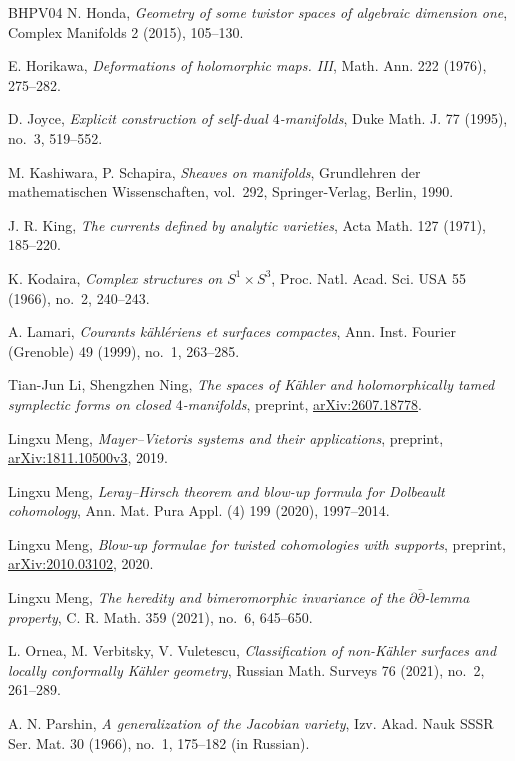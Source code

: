\documentclass[11pt]{amsart}
\numberwithin{equation}{section}
\theoremstyle{plain}
\theoremstyle{definition}
\begin{document}
\begin{thebibliography}{BHPV04}
N. Honda,
\textit{Geometry of some twistor spaces of algebraic dimension one},
Complex Manifolds 2 (2015), 105--130.

E. Horikawa,
\textit{Deformations of holomorphic maps. III},
Math. Ann. 222 (1976), 275--282.

D. Joyce,
\textit{Explicit construction of self-dual $4$-manifolds},
Duke Math. J. 77 (1995), no.~3, 519--552.

M. Kashiwara, P. Schapira,
\textit{Sheaves on manifolds},
Grundlehren der mathematischen Wissenschaften, vol.~292,
Springer-Verlag, Berlin, 1990.

J. R. King,
\textit{The currents defined by analytic varieties},
Acta Math. 127 (1971), 185--220.

K. Kodaira,
\textit{Complex structures on $S^1\times S^3$},
Proc. Natl. Acad. Sci. USA 55 (1966), no.~2, 240--243.

A. Lamari,
\textit{Courants k\"ahl\'eriens et surfaces compactes},
Ann. Inst. Fourier (Grenoble) 49 (1999), no.~1, 263--285.

Tian-Jun Li, Shengzhen Ning,
\textit{The spaces of K\"ahler and holomorphically tamed symplectic forms on
closed $4$-manifolds},
preprint, \href{https://arxiv.org/abs/2607.18778}{arXiv:2607.18778}.

Lingxu Meng,
\textit{Mayer--Vietoris systems and their applications},
preprint, \href{https://arxiv.org/abs/1811.10500v3}{arXiv:1811.10500v3}, 2019.

Lingxu Meng,
\textit{Leray--Hirsch theorem and blow-up formula for Dolbeault cohomology},
Ann. Mat. Pura Appl. (4) 199 (2020), 1997--2014.

Lingxu Meng,
\textit{Blow-up formulae for twisted cohomologies with supports},
preprint, \href{https://arxiv.org/abs/2010.03102}{arXiv:2010.03102}, 2020.

Lingxu Meng,
\textit{The heredity and bimeromorphic invariance of the
$\partial\bar\partial$-lemma property},
C. R. Math. 359 (2021), no.~6, 645--650.

L. Ornea, M. Verbitsky, V. Vuletescu,
\textit{Classification of non-K\"ahler surfaces and locally conformally
K\"ahler geometry},
Russian Math. Surveys 76 (2021), no.~2, 261--289.

%
A. N. Parshin,
\textit{A generalization of the Jacobian variety},
Izv. Akad. Nauk SSSR Ser. Mat. 30 (1966), no.~1, 175--182 (in Russian).


\end{thebibliography}
\end{document}
